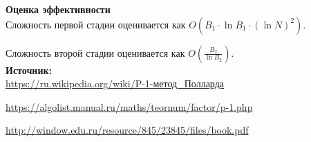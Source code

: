 \documentclass[12pt,a4paper]{scrartcl}
\begin{document}
\textbf{Оценка эффективности}\\

Сложность первой стадии оценивается как $O(B_{1}\cdot \ln B_{1}\cdot (\ln N)^{2})$.

Сложность второй стадии оценивается как $O({\frac {B_{2}}{\ln B_{2}}})$.\\

\textbf{Источник:}\\

\href{https://ru.wikipedia.org/wiki/P%E2%88%921-%D0%BC%D0%B5%D1%82%D0%BE%D0%B4_%D0%9F%D0%BE%D0%BB%D0%BB%D0%B0%D1%80%D0%B4%D0%B0}{https://ru.wikipedia.org/wiki/P-1-метод\_Полларда}
	
\href{https://algolist.manual.ru/maths/teornum/factor/p-1.php}{https://algolist.manual.ru/maths/teornum/factor/p-1.php}
	
\href{http://window.edu.ru/resource/845/23845/files/book.pdf}{http://window.edu.ru/resource/845/23845/files/book.pdf}
\end{document}
